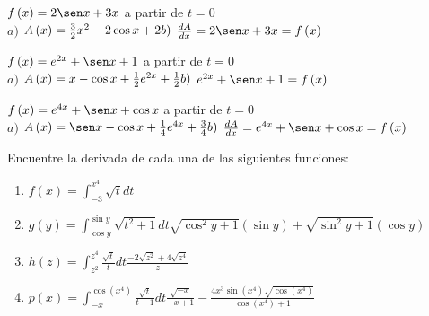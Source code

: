 \begin{ejer}
{$f\left( x\right) =2\sen x+3x$ a partir de $t=0$} \\
{$a)$ $A\left( x\right) =\frac{3}{2}x^{2}-2\cos x+2\qquad \\ 
b)$ $\frac{dA}{dx}=2\sen x+3x=f\left( x\right)$}
\end{ejer}



\begin{ejer}
{$f\left( x\right) =e^{2x}+\sen x+1$ a partir de $t=0$} \\
{$a)$ $A\left( x\right) =x-\cos x+\frac{1}{2}e^{2x}+\frac{1}{2}\qquad \\ 
b)$ $e^{2x}+\sen x+1=f\left( x\right)$}
\end{ejer}



\begin{ejer}
{$f\left( x\right) =e^{4x}+\sen x+\cos x$ a partir de $t=0$} \\
{$a)$ $A\left( x\right) =\sen x-\cos x+\frac{1}{4}e^{4x}+\frac{3}{4}\qquad \\ 
b)$ $\frac{dA}{dx}=e^{4x}+\sen x+\cos x=f\left( x\right)$}
\end{ejer}



\begin{ejer}{Encuentre la derivada de cada una de las siguientes funciones:}
\end{ejer}
\begin{enumerate}

\item $f(x)=\displaystyle\int_{-3}^{x^{4}}\sqrt{t}dt$


\item {$g(y)=\displaystyle\int_{\cos y}^{\sin y}\sqrt{t^{2}+1}dt$}{$\sqrt{\cos^{2}y+1}(\sin y)+\sqrt{\sin ^{2}y+1}(\cos y)$}


\item{$h(z)=\displaystyle\int_{z^{2}}^{z^{4}}\frac{\sqrt{t}}{t}dt$}{$\frac{-2\sqrt{z^{2}}+4\sqrt{z^{4}}}{z}$}


\item{$p(x)=\displaystyle\int_{-x}^{\cos (x^{4})}\frac{\sqrt{t}}{t+1}dt$}{$\frac{\sqrt{-x}}{-x+1}-\frac{4x^{3}\sin (x^{4})\sqrt{\cos (x^{4})}}{\cos (x^{4})+1}$}

\end{enumerate}



